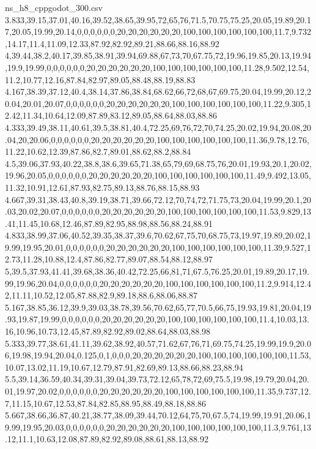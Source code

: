 \begin{filecontents*}[overwrite]{ns_h8_cppgodot_300.csv}
3.833,39.15,37.01,40.16,39.52,38.65,39.95,72,65,76,71.5,70.75,75.25,20.05,19.89,20.17,20.05,19.99,20.14,0,0,0,0,0,0,20,20,20,20,20,20,100,100,100,100,100,100,11.7,9.732,14.17,11.4,11.09,12.33,87.92,82.92,89.21,88.66,88.16,88.92
4,39.44,38.2,40.17,39.85,38.91,39.94,69.88,67,73,70,67.75,72,19.96,19.85,20.13,19.94,19.9,19.99,0,0,0,0,0,0,20,20,20,20,20,20,100,100,100,100,100,100,11.28,9.502,12.54,11.2,10.77,12.16,87.84,82.97,89.05,88.48,88.19,88.83
4.167,38.39,37.12,40.4,38.14,37.86,38.84,68.62,66,72,68,67,69.75,20.04,19.99,20.12,20.04,20.01,20.07,0,0,0,0,0,0,20,20,20,20,20,20,100,100,100,100,100,100,11.22,9.305,12.42,11.34,10.64,12.09,87.89,83.12,89.05,88.64,88.03,88.86
4.333,39.49,38.11,40.61,39.5,38.81,40.4,72.25,69,76,72,70,74.25,20.02,19.94,20.08,20.04,20,20.06,0,0,0,0,0,0,20,20,20,20,20,20,100,100,100,100,100,100,11.36,9.78,12.76,11.22,10.62,12.39,87.86,82.7,89.01,88.62,88.2,88.84
4.5,39.06,37.93,40.22,38.8,38.6,39.65,71.38,65,79,69,68.75,76,20.01,19.93,20.1,20.02,19.96,20.05,0,0,0,0,0,0,20,20,20,20,20,20,100,100,100,100,100,100,11.49,9.492,13.05,11.32,10.91,12.61,87.93,82.75,89.13,88.76,88.15,88.93
4.667,39.31,38.43,40.8,39.19,38.71,39.66,72.12,70,74,72,71.75,73,20.04,19.99,20.1,20.03,20.02,20.07,0,0,0,0,0,0,20,20,20,20,20,20,100,100,100,100,100,100,11.53,9.829,13.41,11.45,10.68,12.46,87.89,82.95,88.98,88.56,88.24,88.91
4.833,38.99,37.06,40.52,39.35,38.37,39.6,70.62,67,75,70,68.75,73,19.97,19.89,20.02,19.99,19.95,20.01,0,0,0,0,0,0,20,20,20,20,20,20,100,100,100,100,100,100,11.39,9.527,12.73,11.28,10.88,12.4,87.86,82.77,89.07,88.54,88.12,88.97
5,39.5,37.93,41.41,39.68,38.36,40.42,72.25,66,81,71,67.5,76.25,20.01,19.89,20.17,19.99,19.96,20.04,0,0,0,0,0,0,20,20,20,20,20,20,100,100,100,100,100,100,11.2,9.914,12.42,11.11,10.52,12.05,87.88,82.9,89.18,88.6,88.06,88.87
5.167,38.85,36.12,39.9,39.03,38.78,39.56,70.62,65,77,70.5,66,75,19.93,19.81,20.04,19.93,19.87,19.99,0,0,0,0,0,0,20,20,20,20,20,20,100,100,100,100,100,100,11.4,10.03,13.16,10.96,10.73,12.45,87.89,82.92,89.02,88.64,88.03,88.98
5.333,39.77,38.61,41.11,39.62,38.92,40.57,71.62,67,76,71,69.75,74.25,19.99,19.9,20.06,19.98,19.94,20.04,0.125,0,1,0,0,0,20,20,20,20,20,20,100,100,100,100,100,100,11.53,10.07,13.02,11.19,10.67,12.79,87.91,82.69,89.13,88.66,88.23,88.94
5.5,39.14,36.59,40.34,39.31,39.04,39.73,72.12,65,78,72,69,75.5,19.98,19.79,20.04,20.01,19.97,20.02,0,0,0,0,0,0,20,20,20,20,20,20,100,100,100,100,100,100,11.35,9.737,12.7,11.15,10.67,12.53,87.84,82.85,88.95,88.49,88.18,88.86
5.667,38.66,36.87,40.21,38.77,38.09,39.44,70.12,64,75,70,67.5,74,19.99,19.91,20.06,19.99,19.95,20.03,0,0,0,0,0,0,20,20,20,20,20,20,100,100,100,100,100,100,11.3,9.761,13.12,11.1,10.63,12.08,87.89,82.92,89.08,88.61,88.13,88.92

\end{filecontents*}
